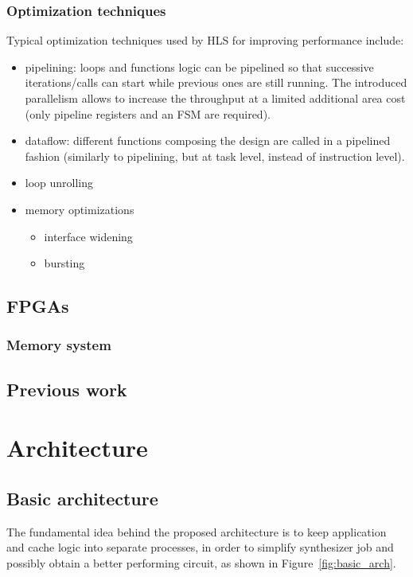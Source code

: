 \documentclass[11pt,a4paper]{memoir}
\begin{document}
\subsection{Optimization techniques}
Typical optimization techniques used by HLS for improving performance include:
\begin{itemize}
	\item pipelining: loops and functions logic can be pipelined so that
		successive iterations/calls can start while previous ones are
		still running. The introduced parallelism allows to increase
		the throughput at a limited additional area cost (only pipeline
		registers and an FSM are required).
	\item dataflow: different functions composing the design are called in
		a pipelined fashion (similarly to pipelining, but at task level,
		instead of instruction level).
	\item loop unrolling
	\item memory optimizations
		\begin{itemize}
			\item interface widening
			\item bursting
		\end{itemize}
\end{itemize}

\section{FPGAs}
\subsection{Memory system}

\section{Previous work}

\chapter{Architecture}
\section{Basic architecture}
The fundamental idea behind the proposed architecture is to keep application and
cache logic into separate processes, in order to simplify synthesizer job and
possibly obtain a better performing circuit, as shown in Figure~\ref{fig:basic_arch}.
\end{document}
